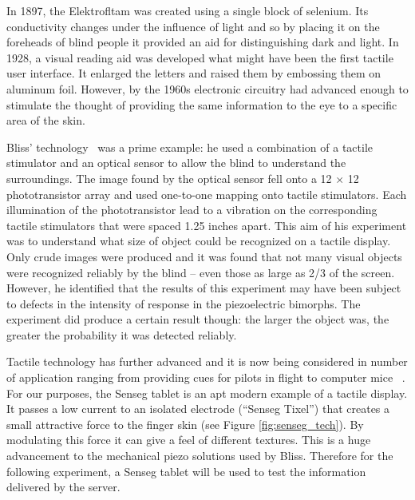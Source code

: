 In 1897, the Elektrofltam was created using a single block of selenium.  Its conductivity changes under the influence of light and so by placing it on the foreheads of blind people  it provided an aid for distinguishing dark and light. In 1928, a visual reading aid was developed  what might have been the first tactile user interface. It enlarged the letters and raised them by embossing them on aluminum foil. However, by the 1960s electronic circuitry had advanced enough to stimulate the thought of providing the same information to the eye to a specific area of the skin.  

Bliss' technology~\citep{bliss1970optical} was a prime example: he used a combination of a tactile stimulator and an optical sensor to allow the blind to understand the surroundings. The image found by the optical sensor fell onto a 12 $\times$ 12 phototransistor array and used one-to-one mapping onto tactile stimulators. Each illumination of the phototransistor lead to a vibration on the corresponding tactile stimulators that were spaced 1.25 inches apart. This aim of his experiment was to understand what size of object could be recognized on a tactile display.  Only crude images were produced and it was found that not many visual objects were recognized reliably by the blind -- even those as large as 2/3 of the screen.  However, he identified that the results of this experiment may have been subject to defects in the intensity of response in the piezoelectric bimorphs.  The experiment did produce a certain result though: the larger the object was, the greater the probability it was detected reliably.  

Tactile technology has further advanced and it is now being considered in number of application ranging from providing cues for pilots in flight \citep{spirkovska2005summary} to computer mice~\citep{akamatsu1996movement} . For our purposes, the Senseg tablet is an apt modern example of a tactile display. It passes a low current to an isolated electrode (``Senseg Tixel'') that creates a small attractive force to the finger skin (see Figure \ref{fig:senseg_tech}). By modulating this force it can give a feel of different textures. This is a huge advancement to the mechanical piezo solutions used by Bliss.  Therefore for the following experiment,  a Senseg tablet will be used to test the information delivered by the server.

